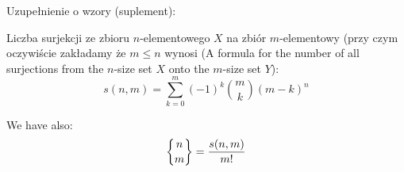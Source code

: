 \documentclass{beamer}
\begin{document}
\begin{frame}
\begin{block}{Uzupełnienie o wzory (suplement):}
\end{block}
Liczba surjekcji ze zbioru $n$-elementowego $X$
na zbiór $m$-elementowy (przy czym oczywiście
zakładamy że $m \leq n$ wynosi
(A formula for the number of all surjections from the $n$-size
set $X$ onto the $m$-size set $Y$):
\[s(n,m) = \sum_{k = 0}^m (-1)^k \binom{m}{k} (m - k)^n
\]

We have also: \[
\stirlingii{n}{m} = \frac{s(n,m)}{m!}
\]
\end{frame}
\end{document}
